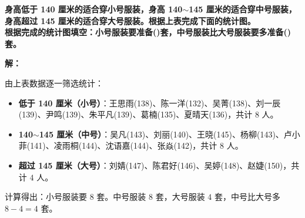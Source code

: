 \textbf{身高低于 140 厘米的适合穿小号服装，身高 140$\sim$145 厘米的适合穿中号服装，身高超过 145 厘米的适合穿大号服装。根据上表完成下面的统计图。}\\
\textbf{根据完成的统计图填空：小号服装要准备(\qquad)套，中号服装比大号服装要多准备(\qquad)套。}

\vspace{0.8cm}
\textbf{解：}

由上表数据逐一筛选统计：
\begin{itemize}
    \item \textbf{低于 140 厘米（小号）}：王思雨(138)、陈一洋(132)、吴菁(138)、刘一辰(139)、尹鸣(139)、朱平凡(139)、葛楠(135)、夏晴天(136)，共计 $8$ 人。
    \item \textbf{140$\sim$145 厘米（中号）}：吴凡(143)、刘丽(140)、王晓(145)、杨柳(143)、卢小菲(141)、凌雨桐(144)、沈语嘉(144)、张焱(142)，共计 $8$ 人。
    \item \textbf{超过 145 厘米（大号）}：刘婧(147)、陈君好(146)、吴婷(148)、赵婕(150)，共计 $4$ 人。
\end{itemize}

计算得出：小号服装要 $8$ 套。中号服装 $8$ 套，大号服装 $4$ 套，中号比大号多 $8 - 4 = 4$ 套。

